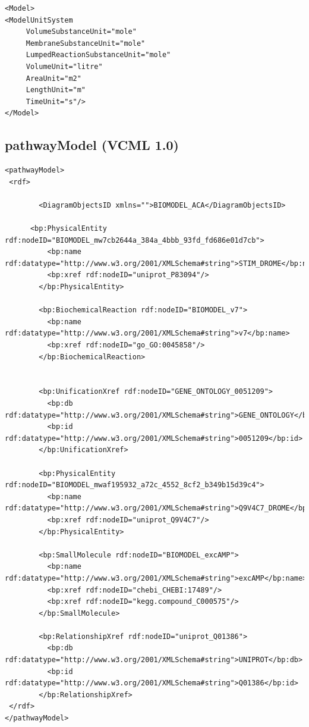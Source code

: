 \begin{verbatim}
<Model>
<ModelUnitSystem 
     VolumeSubstanceUnit="mole" 
     MembraneSubstanceUnit="mole"
     LumpedReactionSubstanceUnit="mole" 
     VolumeUnit="litre" 
     AreaUnit="m2"
     LengthUnit="m" 
     TimeUnit="s"/>
</Model>
\end{verbatim}

\subsection{pathwayModel (VCML 1.0)}
\label{sec:pathwayModel}

{\tiny
\begin{verbatim}
<pathwayModel>
 <rdf>
 
        <DiagramObjectsID xmlns="">BIOMODEL_ACA</DiagramObjectsID>
 
      <bp:PhysicalEntity rdf:nodeID="BIOMODEL_mw7cb2644a_384a_4bbb_93fd_fd686e01d7cb">
          <bp:name rdf:datatype="http://www.w3.org/2001/XMLSchema#string">STIM_DROME</bp:name>
          <bp:xref rdf:nodeID="uniprot_P83094"/>
        </bp:PhysicalEntity>
        
        <bp:BiochemicalReaction rdf:nodeID="BIOMODEL_v7">
          <bp:name rdf:datatype="http://www.w3.org/2001/XMLSchema#string">v7</bp:name>
          <bp:xref rdf:nodeID="go_GO:0045858"/>
        </bp:BiochemicalReaction>        


        <bp:UnificationXref rdf:nodeID="GENE_ONTOLOGY_0051209">
          <bp:db rdf:datatype="http://www.w3.org/2001/XMLSchema#string">GENE_ONTOLOGY</bp:db>
          <bp:id rdf:datatype="http://www.w3.org/2001/XMLSchema#string">0051209</bp:id>
        </bp:UnificationXref>
        
        <bp:PhysicalEntity rdf:nodeID="BIOMODEL_mwaf195932_a72c_4552_8cf2_b349b15d39c4">
          <bp:name rdf:datatype="http://www.w3.org/2001/XMLSchema#string">Q9V4C7_DROME</bp:name>
          <bp:xref rdf:nodeID="uniprot_Q9V4C7"/>
        </bp:PhysicalEntity>
        
        <bp:SmallMolecule rdf:nodeID="BIOMODEL_excAMP">
          <bp:name rdf:datatype="http://www.w3.org/2001/XMLSchema#string">excAMP</bp:name>
          <bp:xref rdf:nodeID="chebi_CHEBI:17489"/>
          <bp:xref rdf:nodeID="kegg.compound_C000575"/>
        </bp:SmallMolecule>  
        
        <bp:RelationshipXref rdf:nodeID="uniprot_Q01386">
          <bp:db rdf:datatype="http://www.w3.org/2001/XMLSchema#string">UNIPROT</bp:db>
          <bp:id rdf:datatype="http://www.w3.org/2001/XMLSchema#string">Q01386</bp:id>
        </bp:RelationshipXref>                      
 </rdf>
</pathwayModel>
\end{verbatim}
}

